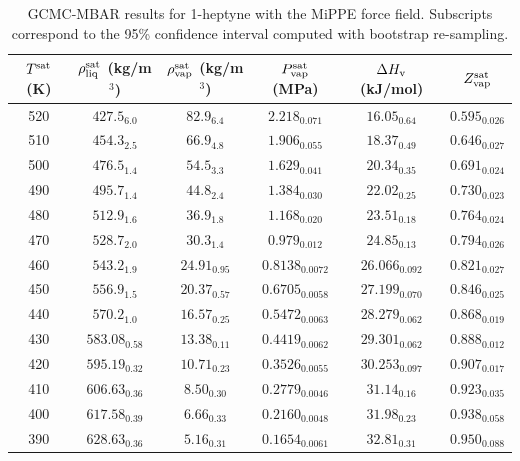 \documentclass[journal=jctc,manuscript=article]{achemso}
\begin{document}
\begin{table}[htb!]
	\caption{GCMC-MBAR results for 1-heptyne with the MiPPE force field. Subscripts correspond to the 95\% confidence interval computed with bootstrap re-sampling.}
	\begin{center}
		\begin{tabular}{|c|c|c|c|c|c|}
			\hline
			$T^{\rm sat}$ (K) & $\rho_{\rm liq}^{\rm sat}$ (kg/m$^3$) & $\rho_{\rm vap}^{\rm sat}$ (kg/m$^3$) & $P_{\rm vap}^{\rm sat}$ (MPa) & $\Delta H_{\rm v}$ (kJ/mol) & $Z_{\rm vap}^{\rm sat}$ \\ \hline
			520 & $427.5_{6.0}$ & $82.9_{6.4}$ & $2.218_{0.071}$ & $16.05_{0.64}$ & $0.595_{0.026}$ \\
			510 & $454.3_{2.5}$ & $66.9_{4.8}$ & $1.906_{0.055}$ & $18.37_{0.49}$ & $0.646_{0.027}$ \\
			500 & $476.5_{1.4}$ & $54.5_{3.3}$ & $1.629_{0.041}$ & $20.34_{0.35}$ & $0.691_{0.024}$ \\
			490 & $495.7_{1.4}$ & $44.8_{2.4}$ & $1.384_{0.030}$ & $22.02_{0.25}$ & $0.730_{0.023}$ \\
			480 & $512.9_{1.6}$ & $36.9_{1.8}$ & $1.168_{0.020}$ & $23.51_{0.18}$ & $0.764_{0.024}$ \\
			470 & $528.7_{2.0}$ & $30.3_{1.4}$ & $0.979_{0.012}$ & $24.85_{0.13}$ & $0.794_{0.026}$ \\
			460 & $543.2_{1.9}$ & $24.91_{0.95}$ & $0.8138_{0.0072}$ & $26.066_{0.092}$ & $0.821_{0.027}$ \\
			450 & $556.9_{1.5}$ & $20.37_{0.57}$ & $0.6705_{0.0058}$ & $27.199_{0.070}$ & $0.846_{0.025}$ \\
			440 & $570.2_{1.0}$ & $16.57_{0.25}$ & $0.5472_{0.0063}$ & $28.279_{0.062}$ & $0.868_{0.019}$ \\
			430 & $583.08_{0.58}$ & $13.38_{0.11}$ & $0.4419_{0.0062}$ & $29.301_{0.062}$ & $0.888_{0.012}$ \\
			420 & $595.19_{0.32}$ & $10.71_{0.23}$ & $0.3526_{0.0055}$ & $30.253_{0.097}$ & $0.907_{0.017}$ \\
			410 & $606.63_{0.36}$ & $8.50_{0.30}$ & $0.2779_{0.0046}$ & $31.14_{0.16}$ & $0.923_{0.035}$ \\
			400 & $617.58_{0.39}$ & $6.66_{0.33}$ & $0.2160_{0.0048}$ & $31.98_{0.23}$ & $0.938_{0.058}$ \\
			390 & $628.63_{0.36}$ & $5.16_{0.31}$ & $0.1654_{0.0061}$ & $32.81_{0.31}$ & $0.950_{0.088}$ \\
			\hline
		\end{tabular}
	\end{center}
\end{table}
\end{document}
